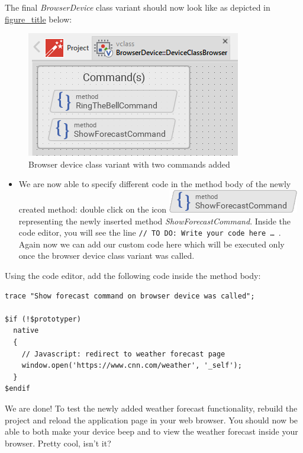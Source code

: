 \documentclass[
  a4paper,
,tablecaptionabove
]{scrbook}
\begin{document}
The final \emph{BrowserDevice} class variant should now look like as
depicted in
\protect\hyperlink{fig:BrowserDeviceBellCommands}{figure\_title} below:

\begin{figure}
\centering
\includegraphics{./../asciidoc/modules/ROOT/assets/images/deviceintegration/DeviceClassBrowserCommands.png}
\caption{Browser device class variant with two commands added}
\end{figure}

\begin{itemize}
\item
  We are now able to specify different code in the method body of the
  newly created method: double click on the icon
  \includegraphics{./../asciidoc/modules/ROOT/assets/images/icons/ShowForecastCommandIcon.png}
  representing the newly inserted method \emph{ShowForecastCommand}.
  Inside the code editor, you will see the line
  \texttt{//\ TO\ DO:\ Write\ your\ code\ here\ \ldots{}​\ }. Again now
  we can add our custom code here which will be executed only once the
  browser device class variant was called.
\end{itemize}

Using the code editor, add the following code inside the method body:

\begin{verbatim}
trace "Show forecast command on browser device was called";

$if (!$prototyper)
  native
  {
    // Javascript: redirect to weather forecast page
    window.open('https://www.cnn.com/weather', '_self');
  }
$endif
\end{verbatim}

We are done! To test the newly added weather forecast functionality,
rebuild the project and reload the application page in your web browser.
You should now be able to both make your device beep and to view the
weather forecast inside your browser. Pretty cool, isn't it?
\end{document}
